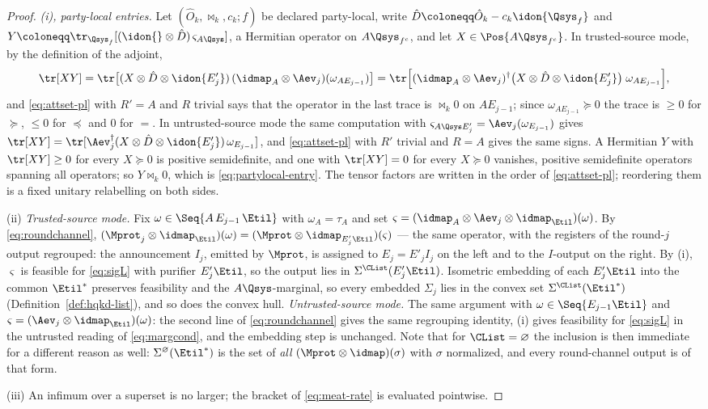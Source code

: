 \begin{proof}
\emph{(i), party-local entries.} Let $(\hat O_k,\bowtie_k,c_k;f)$ be
declared party-local, write
$\hat D\coloneqq\hat O_k-c_k\idon{\Qsys_f}$ and
$Y\coloneqq\tr_{\Qsys_f}[(\idon{}\otimes\hat D)\,\varsigma_{A\Qsys}]$, a
Hermitian operator on $A\Qsys_{f^c}$, and let $X\in\Pos{A\Qsys_{f^c}}$. In
trusted-source mode, by the definition of the adjoint,
\begin{equation*}
  \tr[XY]=\tr\big[(X\otimes\hat D\otimes\idon{E'_j})\,
  (\idmap_A\otimes\Aev_j)(\omega_{AE_{j-1}})\big]
  =\tr\Big[(\idmap_A\otimes\Aev_j)^{\dagger}
  \big(X\otimes\hat D\otimes\idon{E'_j}\big)\;\omega_{AE_{j-1}}\Big],
\end{equation*}
and \eqref{eq:attset-pl} with $R'=A$ and $R$ trivial says that the operator
in the last trace is $\bowtie_k0$ on $AE_{j-1}$; since
$\omega_{AE_{j-1}}\succeq0$ the trace is $\ge0$ for $\succeq$, $\le0$ for
$\preceq$ and $0$ for $=$. In untrusted-source mode the same computation
with $\varsigma_{A\Qsys E'_j}=\Aev_j(\omega_{E_{j-1}})$ gives
$\tr[XY]=\tr[\Aev_j^{\dagger}(X\otimes\hat D\otimes\idon{E'_j})\,
\omega_{E_{j-1}}]$, and \eqref{eq:attset-pl} with $R'$ trivial and $R=A$
gives the same signs. A Hermitian $Y$ with $\tr[XY]\ge0$ for every
$X\succeq0$ is positive semidefinite, and one with $\tr[XY]=0$ for every
$X\succeq0$ vanishes, positive semidefinite operators spanning all
operators; so $Y\bowtie_k0$, which is \eqref{eq:partylocal-entry}. The
tensor factors are written in the order of \eqref{eq:attset-pl}; reordering
them is a fixed unitary relabelling on both sides.

(ii) \emph{Trusted-source mode.} Fix
$\omega\in\Seq{A\,E_{j-1}\,\Etil}$ with $\omega_A=\tau_A$ and
set
$\varsigma=(\idmap_A\otimes\Aev_j\otimes\idmap_{\Etil})(\omega)$. By
\eqref{eq:roundchannel},
$(\Mprot_j\otimes\idmap_{\Etil})(\omega)
=(\Mprot\otimes\idmap_{E'_j\Etil})(\varsigma)$ --- the same operator,
with the registers of the round-$j$ output regrouped: the announcement $I_j$,
emitted by $\Mprot$, is assigned to $E_j=E'_jI_j$ on the left and to
the $I$-output on the right. By (i), $\varsigma$ is feasible for
\eqref{eq:sigL} with purifier $E'_j\Etil$, so the output lies in
$\Sigma^{\CList}(E'_j\Etil)$. Isometric embedding of each $E'_j\Etil$
into the common $\Etil^{*}$ preserves feasibility and the
$A\Qsys$-marginal, so every embedded $\Sigma_j$ lies in the convex set
$\Sigma^{\CList}(\Etil^{*})$ (Definition~\ref{def:hqkd-list}), and so
does the convex hull. \emph{Untrusted-source mode.} The same argument
with $\omega\in\Seq{E_{j-1}\Etil}$ and
$\varsigma=(\Aev_j\otimes\idmap_{\Etil})(\omega)$: the second line of
\eqref{eq:roundchannel} gives the same regrouping identity, (i) gives
feasibility for \eqref{eq:sigL} in the untrusted reading of
\eqref{eq:margcond}, and the embedding step is unchanged. Note that
for $\CList=\varnothing$ the inclusion is then immediate for a
different reason as well: $\Sigma^{\varnothing}(\Etil^{*})$ is the set
of \emph{all} $(\Mprot\otimes\idmap)(\sigma)$ with $\sigma$ normalized,
and every round-channel output is of that form.

(iii) An infimum over a superset is no larger; the bracket of
\eqref{eq:meat-rate} is evaluated pointwise.
\end{proof}
